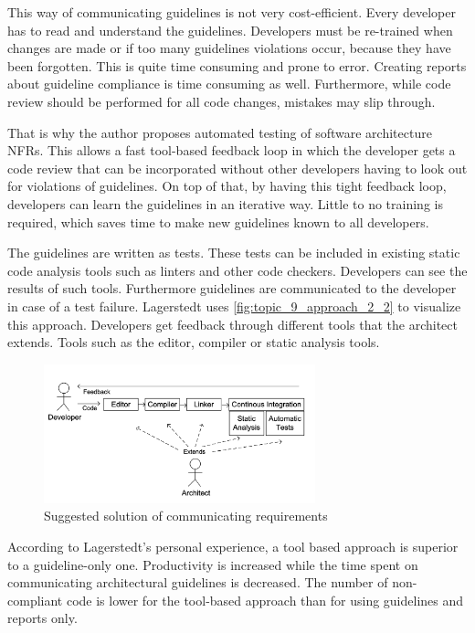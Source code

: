 This way of communicating guidelines is not very cost-efficient.
Every developer has to read and understand the guidelines. Developers must be re-trained when changes are made or if too many guidelines violations occur, because they have been forgotten.
This is quite time consuming and prone to error.  Creating reports about guideline compliance is time consuming as well.
Furthermore, while code review should be performed for all code changes, mistakes may slip through.

That is why the author proposes automated testing of software architecture \glspl{NFR}.
This allows a fast tool-based feedback loop in which the developer gets a code review that can be incorporated without other developers having to look out for violations of guidelines.
On top of that, by having this tight feedback loop, developers can learn the guidelines in an iterative way.
Little to no training is required, which saves time to make new guidelines known to all developers.

The guidelines are written as tests. These tests can be included in existing static code analysis tools such as linters and other code checkers. Developers can see the results of such tools.
Furthermore guidelines are communicated to the developer in case of a test failure.
Lagerstedt uses \autoref{fig:topic_9_approach_2_2} to visualize this approach.
Developers get feedback through different tools that the architect extends. Tools such as the editor, compiler or static analysis tools.

\begin{figure}[htbp]
	\centering
	\includegraphics[width=0.7\textwidth]{../images/topic_9_approach_2_2.png}
	\caption{Suggested solution of communicating requirements~\cite{Lagerstedt2014}}
	\label{fig:topic_9_approach_2_2}
\end{figure}

According to Lagerstedt's personal experience, a tool based approach is superior to a guideline-only one.
Productivity is increased while the time spent on communicating architectural guidelines is decreased.
The number of non-compliant code is lower for the tool-based approach than for using guidelines and reports only.


